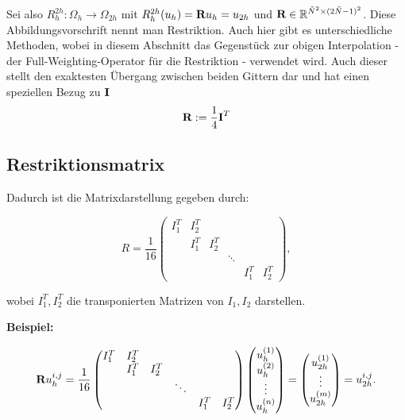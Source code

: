 Sei also $R_{h}^{2h}: \Omega_{h} \longrightarrow \Omega_{2h}$ mit $R_{h}^{2h}(u_{h}) = {\textbf{R}}u_{h} = u_{2h}$ und ${\textbf{R}} \in \mathbb{R}^{\tilde N^{2} \times (2 \tilde N - 1)^{2}}$. Diese Abbildungsvorschrift nennt man Restriktion. Auch hier gibt es unterschiedliche Methoden, wobei in diesem Abschnitt das Gegenstück zur obigen Interpolation - der Full-Weighting-Operator für die Restriktion - verwendet wird. Auch dieser stellt den exaktesten Übergang zwischen beiden Gittern dar und hat einen speziellen Bezug zu ${\textbf{I}}$
\begin{equation}
{\textbf{R}} := \frac {1} {4} {\textbf{I}}^{T}
\end{equation}

\subsection{Restriktionsmatrix}

Dadurch ist die Matrixdarstellung gegeben durch:

\begin{equation}
R = \frac{1}{16}
\begin{pmatrix}
I_{1}^{T} & I_{2}^{T}\\
		  & I_{1}^{T} & I_{2}^{T}\\
		  &			  &			  & \ddots\\
		  &			  &			  &		   & I_{1}^{T} & I_{2}^{T}
\end{pmatrix},
\end{equation}

wobei $I_{1}^{T}, I_{2}^{T}$ die transponierten Matrizen von $I_{1}, I_{2}$ darstellen.

\textbf{Beispiel:}

\begin{equation}
{\textbf{R}}u^{i,j}_{h} = \frac {1} {16}
\begin{pmatrix}
I_{1}^{T} & I_{2}^{T}\\
		  & I_{1}^{T} & I_{2}^{T}\\
		  &			  &			  & \ddots\\
		  &			  &			  &		   & I_{1}^{T} & I_{2}^{T}
\end{pmatrix}
\begin{pmatrix}
u_{h}^{(1)} \\
u_{h}^{(2)} \\
\vdots \\
u_{h}^{(n)}
\end{pmatrix} =
\begin{pmatrix}
u_{2h}^{(1)} \\
\vdots \\
u_{2h}^{(m)}
\end{pmatrix} =
u^{i,j}_{2h}.
\end{equation}

